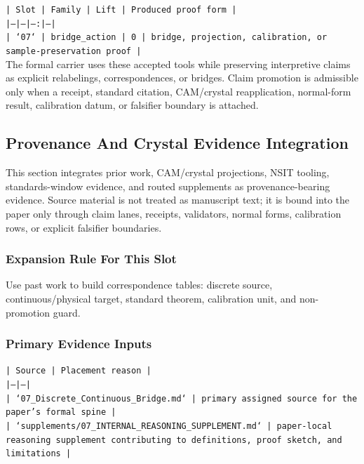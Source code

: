\documentclass[11pt]{article}
\begin{document}
\noindent\texttt{| Slot | Family | Lift | Produced proof form |}\\
\noindent\texttt{|---|---|---:|---|}\\
\noindent\texttt{| `07` | bridge\_action | 0 | bridge, projection, calibration, or sample-preservation proof |}\\

The formal carrier uses these accepted tools while preserving interpretive
claims as explicit relabelings, correspondences, or bridges. Claim promotion is admissible only when a receipt, standard citation,
CAM/crystal reapplication, normal-form result, calibration datum, or falsifier
boundary is attached.

\subsection*{Provenance And Crystal Evidence Integration}

This section integrates prior work, CAM/crystal projections, NSIT tooling,
standards-window evidence, and routed supplements as provenance-bearing
evidence. Source material is not treated as manuscript text; it is bound into
the paper only through claim lanes, receipts, validators, normal forms,
calibration rows, or explicit falsifier boundaries.

\subsubsection*{Expansion Rule For This Slot}

Use past work to build correspondence tables: discrete source, continuous/physical target, standard theorem, calibration unit, and non-promotion guard.

\subsubsection*{Primary Evidence Inputs}

\noindent\texttt{| Source | Placement reason |}\\
\noindent\texttt{|---|---|}\\
\noindent\texttt{| `07\_Discrete\_Continuous\_Bridge.md` | primary assigned source for the paper's formal spine |}\\
\noindent\texttt{| `supplements/07\_INTERNAL\_REASONING\_SUPPLEMENT.md` | paper-local reasoning supplement contributing to definitions, proof sketch, and limitations |}\\
\end{document}
